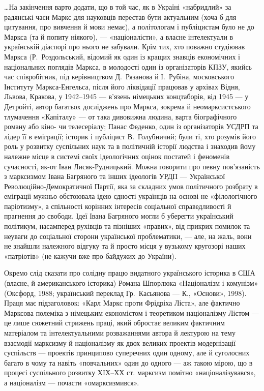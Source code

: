 \ldots{}На закінчення варто додати, що в той час, як в Україні «набридлий» 
за радянські часи Маркс для науковців перестав бути актуальним (хоча б 
для цитування, про вивчення й мови немає), а політологам і публіцистам 
було не до Маркса (та й попиту ніякого), — «націоналісти», а власне 
інтелектуали в українській діаспорі про нього не забували. Крім тих, 
хто поважно студіював Маркса (Р.~Роздольський, відомий як один із 
кращих знавців економічних і національних поглядів Маркса, в 
молодості один із організаторів КПЗУ, якийсь час співробітник, під 
керівництвом Д.~Рязанова й І.~Рубіна, московського Інституту 
Маркса-Енгельса, після його ліквідації працював у архівах Відня, 
Львова, Кракова, у 1942--1945 — в'язень німецьких концтаборів, від 1945 — у 
Детройті, автор багатьох досліджень про Маркса, зокрема й 
неомарксистського тлумачення «Капіталу» — от така дивовижна людина, 
варта біографічного роману або кіно- чи телесеріалу; Панас Феденко, 
один із організаторів УСДРП та лідер її в еміграції; історик і 
публіцист В.~Голубничий; були ті, хто розумів його роль у розвитку 
суспільних наук та в політичній історії людства і знаходив йому 
належне місце в системі своїх ідеологічних оцінок постатей і 
феноменів сучасності, як-от Іван Лисяк-Рудницький. Можна говорити про 
певну пов'язаність з марксизмом Івана Багряного та інших ідеологів 
УРДП — Української Революційно-Демократичної Партії, яка за складних 
умов політичного розбрату в еміграції мужньо обстоювала ідею єдності 
українців на основі не «філологічного паріотизму», а спільності 
корінних інтересів соціальної справедливості й прагнення до свободи. 
Ідеї Івана Багряного могли б уберегти український політикум, 
насамперед рухівців та пізніших «правих», від прикрих помилок та 
неуваги до соціальної сторони української проблематики, — але, на 
жаль, вони не знайшли належного відгуку та й просто місця у вузькому 
кругозорі наших «патріотів» (не кажучи вже про байдужих до України). 


Окремо слід сказати про солідну працю видатного українського 
історика в США (власне, й американського історика) Романа Шпорлюка 
«Націоналізм і комунізм» (Оксфорд, 1988; український переклад Гр.~Касьянова — К., «Основи», 1998). Праця має підзаголовок: «Карл Маркс проти 
Фрідріха Ліста», але фактично Марксова полеміка з німецьким 
економістом і теоретиком націоналізму Лістом — це лише сюжетний 
стрижень праці, який обростає великим фактичним матеріалом та 
інтелектуальними розважаннями автора й лектурою на тему взаємодії 
марксизму й націоналізму як двох великих проектів модернізації 
суспільств — проектів принципово суперечних один одному, але й 
суголосних багато в чому та навіть «повчальних» один до одного — аж 
такою мірою, що в процесі суспільного розвитку ХIХ--ХХ ст. марксизм 
помітно «націоналізувався», а націоналізм — почасти «омарксизмився».


